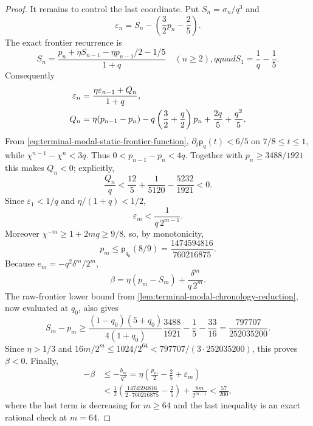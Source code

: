 \begin{proof}
It remains to control the last coordinate.  Put
$S_n=\sigma_n/q^3$ and
\begin{equation}
 \varepsilon_n=S_n-\left(\frac32p_n-\frac25\right).
\end{equation}
The exact frontier recurrence is
\[
 S_n=\frac{p_n+\eta S_{n-1}-\eta p_{n-1}/2-1/5}{1+q}
 \quad(n\ge2),qquad S_1=\frac1q-\frac15.
\]
Consequently
\begin{align}
 \varepsilon_n
 &=\frac{\eta\varepsilon_{n-1}+Q_n}{1+q},
 \notag\\
 Q_n&=\eta(p_{n-1}-p_n)
 -q\left(\frac32+\frac q2\right)p_n
 +\frac{2q}{5}+\frac{q^2}{5}.
 \label{eq:terminal-modal-static-endpoint-error}
\end{align}
From \eqref{eq:terminal-modal-static-frontier-function},
$\partial_t\mathsf p_q(t)<6/5$ on $7/8\le t\le1$, while
$\chi^{n-1}-\chi^n<3q$.  Thus
$0<p_{n-1}-p_n<4q$.  Together with
$p_n\ge3488/1921$ this makes $Q_n<0$; explicitly,
\[
 \frac{Q_n}{q}<\frac{12}{5}+\frac1{5120}
 -\frac{5232}{1921}<0.
\]
Since $\varepsilon_1<1/q$ and $\eta/(1+q)<1/2$,
\begin{equation}
 \varepsilon_m<\frac{1}{q\,2^{m-1}}.
 \label{eq:terminal-modal-static-endpoint-error-bound}
\end{equation}
Moreover $\chi^{-m}\ge1+2mq\ge9/8$, so, by monotonicity,
\[
 p_m\le \mathsf p_{q_0}(8/9)
 =\frac{1474594816}{760216875}.
\]
Because $e_m=-q^2\delta^m/2^m$,
\[
 \beta=\eta(p_m-S_m)+\frac{\delta^m}{q\,2^m}.
\]
The raw-frontier lower bound from
\cref{lem:terminal-modal-chronology-reduction}, now evaluated at $q_0$,
also gives
\[
 S_m-p_m\ge
 \frac{(1-q_0)(5+q_0)}{4(1+q_0)}\frac{3488}{1921}
 -\frac15-\frac{33}{16}
 =\frac{797707}{252035200}.
\]
Since $\eta>1/3$ and
$16m/2^m\le1024/2^{64}<797707/(3\cdot252035200)$, this proves
$\beta<0$.  Finally,
\begin{align*}
 -\beta
 &\le-\frac{b_m}{q^3}
 =\eta\left(\frac{p_m}{2}-\frac25+\varepsilon_m\right)\\
 &<\frac12\left(
 \frac{1474594816}{2\cdot760216875}-\frac25\right)
 +\frac{8m}{2^{m-1}}<\frac{57}{200},
\end{align*}
where the last term is decreasing for $m\ge64$ and the last inequality is
an exact rational check at $m=64$.


\end{proof}
